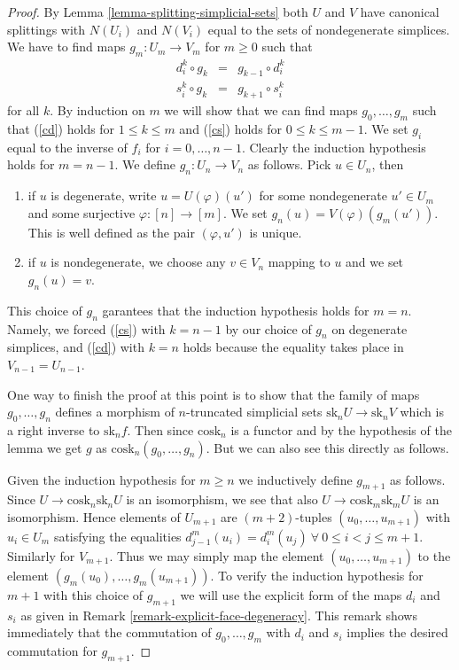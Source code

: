 \begin{proof}
By Lemma \ref{lemma-splitting-simplicial-sets}
both $U$ and $V$ have canonical splittings with $N(U_i)$
and $N(V_i)$ equal to the sets of nondegenerate simplices.
We have to find maps $g_m : U_m \to V_m$ for $m \geq 0$ such
that
\begin{eqnarray}
d^k_i \circ g_k & = & g_{k - 1} \circ d^k_i \label{cd}\\
s^k_i \circ g_k & = & g_{k + 1} \circ s^k_i \label{cs}
\end{eqnarray}
for all $k$. By induction on $m$ we will show that we can find maps
$g_0, \ldots, g_m$ such that (\ref{cd}) holds for
$1 \leq k \leq m$ and (\ref{cs}) holds for $0 \leq k \leq m - 1$.
We set $g_i$ equal to the inverse of $f_i$ for $i = 0, \ldots, n - 1$.
Clearly the induction hypothesis holds for $m = n - 1$.
We define $g_n : U_n \to V_n$ as follows.
Pick $u \in U_n$, then
\begin{enumerate}
\item if $u$ is degenerate, write  $u = U(\varphi)(u')$
for some nondegenerate $u' \in U_m$ and some
surjective $\varphi : [n] \to [m]$. We set
$g_n(u) = V(\varphi)(g_m(u'))$. This is well defined
as the pair $(\varphi, u')$ is unique.
\item if $u$ is nondegenerate, we choose any $v \in V_n$
mapping to $u$ and we set $g_n(u) = v$.
\end{enumerate}
This choice of $g_n$ garantees that the induction hypothesis
holds for $m = n$. Namely, we forced (\ref{cs}) with $k = n - 1$
by our choice of $g_n$ on degenerate simplices, and (\ref{cd})
with $k = n$ holds because the equality takes place in
$V_{n - 1} = U_{n - 1}$.

\medskip\noindent
One way to finish the proof at this point is to show
that the family of maps $g_0, \ldots, g_n$ defines
a morphism of $n$-truncated simplicial sets
$\text{sk}_n U \to \text{sk}_n V$ which is
a right inverse to $\text{sk}_nf$. Then since
$\text{cosk}_n$ is a functor and by the hypothesis
of the lemma we get $g$ as $\text{cosk}_n(g_0, \ldots, g_n)$.
But we can also see this directly as follows.

\medskip\noindent
Given the induction hypothesis for $m \geq n$
we inductively define $g_{m + 1}$ as follows.
Since $U \to \text{cosk}_n \text{sk}_n U$
is an isomorphism, we see that also
$U \to \text{cosk}_m \text{sk}_m U$ is an
isomorphism. Hence elements of $U_{m + 1}$
are $(m + 2)$-tuples $(u_0, \ldots, u_{m + 1})$ with
$u_i \in U_m$ satisfying the equalities
$d^m_{j - 1}(u_i) = d^m_i(u_j)\ \forall\ 0\leq i < j\leq m + 1$.
Similarly for $V_{m + 1}$.
Thus we may simply map the element
$(u_0, \ldots, u_{m + 1})$ to the element
$(g_m(u_0), \ldots, g_m(u_{m + 1}))$.
To verify the induction hypothesis for $m + 1$ with
this choice of $g_{m + 1}$ we will use the
explicit form of the maps $d_i$ and $s_i$
as given in Remark \ref{remark-explicit-face-degeneracy}.
This remark shows immediately that the commutation of
$g_0, \ldots, g_m$ with $d_i$ and $s_i$ implies the
desired commutation for $g_{m + 1}$.
\end{proof}

